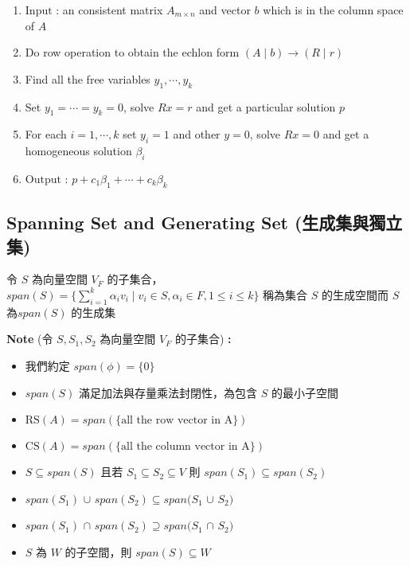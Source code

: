 \documentclass[
]{book}
\providecommand{\tightlist}{%
  \setlength{\itemsep}{0pt}\setlength{\parskip}{0pt}}
\begin{document}
\begin{enumerate}
\def\labelenumi{\arabic{enumi}.}
\tightlist
\item
  \(\mbox{Input :}\) an consistent matrix \(A_{m \times n}\) and vector \(b\) which is in the column space of \(A\)
\item
  Do row operation to obtain the echlon form \((A\mid b) \rightarrow (R \mid r)\)
\item
  Find all the free variables \(y_1, \cdots, y_k\)
\item
  Set \(y_1= \cdots = y_k = 0\), solve \(Rx = r\) and get a particular solution \(p\)
\item
  For each \(i = 1, \cdots, k\) set \(y_i = 1\) and other \(y = 0\), solve \(Rx = 0\) and get a homogeneous solution \(\beta_i\)
\item
  \(\mbox{Output :}\) \(p + c_1\beta_1 + \cdots + c_k\beta_k\)
\end{enumerate}

\hypertarget{spanning-set-and-generating-set-ux751fux6210ux96c6ux8207ux7368ux7acbux96c6}{%
\subsection{Spanning Set and Generating Set (生成集與獨立集)}\label{spanning-set-and-generating-set-ux751fux6210ux96c6ux8207ux7368ux7acbux96c6}}

令 \(S\) 為向量空間 \(V_F\) 的子集合，\(\displaystyle span(S) = \{\sum_{i = 1}^{k}\alpha_i v_i \mid v_i \in S, \alpha_i \in F, 1 \leq i \leq k\}\) 稱為集合 \(S\) 的生成空間而 \(S\) 為\(span(S)\) 的生成集

\textbf{Note} (令 \(S,S_1,S_2\) 為向量空間 \(V_F\) 的子集合) \textbf{:}

\begin{itemize}
\tightlist
\item
  我們約定 \(span(\phi) = \{0\}\)
\item
  \(span(S)\) 滿足加法與存量乘法封閉性，為包含 \(S\) 的最小子空間
\item
  \(\mbox{RS}(A) = span(\{\mbox{all the row vector in A}\})\)
\item
  \(\mbox{CS}(A) = span(\{\mbox{all the column vector in A}\})\)
\item
  \(S \subseteq span(S)\) 且若 \(S_1 \subseteq S_2 \subseteq V\) 則 \(span(S_1) \subseteq span(S_2)\)
\item
  \(span(S_1)\) \(\cup\) \(span(S_2) \subseteq span(S_1\) \(\cup\) \(S_2)\)
\item
  \(span(S_1)\) \(\cap\) \(span(S_2) \supseteq span(S_1\) \(\cap\) \(S_2)\)
\item
  \(S\) 為 \(W\) 的子空間，則 \(span(S) \subseteq W\)
\end{itemize}
\end{document}
